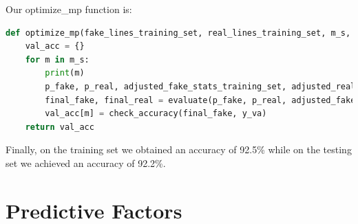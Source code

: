 \documentclass{article}
\begin{document}
Our optimize\_mp function is:
\begin{lstlisting}[language=Python]
def optimize_mp(fake_lines_training_set, real_lines_training_set, m_s, mp):
    val_acc = {}
    for m in m_s:
        print(m)
        p_fake, p_real, adjusted_fake_stats_training_set, adjusted_real_stats_training_set = training_part(fake_lines_training_set, real_lines_training_set, m, mp)
        final_fake, final_real = evaluate(p_fake, p_real, adjusted_fake_stats_training_set, adjusted_real_stats_training_set, validation_set)
        val_acc[m] = check_accuracy(final_fake, y_va)
    return val_acc

  \end{lstlisting}

Finally, on the training set we obtained an accuracy of 92.5\% while on the testing set we achieved an accuracy of 92.2\%.

   \section{Predictive Factors}
\end{document}
